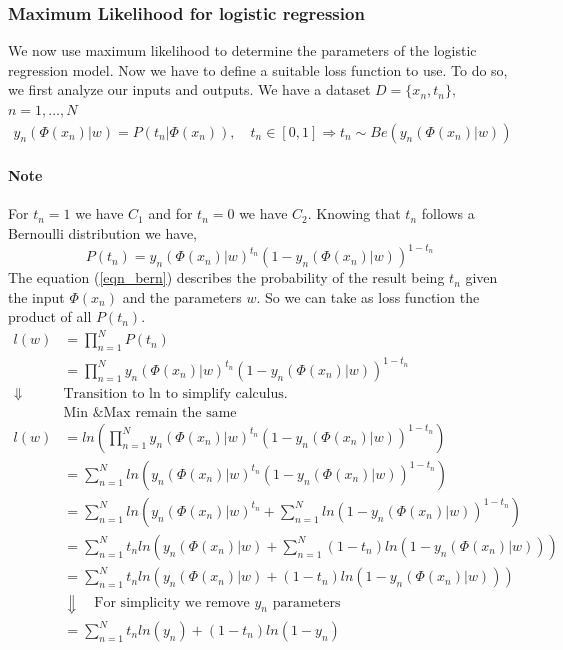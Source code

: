 \documentclass[main.tex]{subfiles}
\begin{document}
\subsubsection{Maximum Likelihood for logistic regression}
We now use maximum likelihood to determine the parameters of the logistic regression model. Now we have to define a suitable loss function to use. To do so, we first analyze our inputs and outputs. We have a dataset $D = \{x_n, t_n\},$ $n=1,\dots,N$
\begin{align*}
    y_n(\Phi(x_n)|w) = P(t_n|\Phi(x_n)), \quad t_n \in [0,1] \Rightarrow t_n \sim Be(y_n(\Phi(x_n)|w))
\end{align*}
\paragraph{Note} For $t_n = 1$ we have $C_1$ and for $t_n = 0$ we have $C_2$.
\newline \newline
Knowing that $t_n$ follows a Bernoulli distribution we have,
\begin{equation}
    P(t_n) = y_n(\Phi(x_n)|w)^{t_n} (1 - y_n(\Phi(x_n)|w))^{1- t_n} \label{eqn_bern}
\end{equation}
The equation (\ref{eqn_bern}) describes the probability of the result being $t_n$ given the input $\Phi(x_n)$ and the parameters $w$. So we can take as loss function the product of all $P(t_n)$.
\begin{align*}
    l(w) &= \prod_{n=1}^N P(t_n) \\
    &= \prod_{n=1}^N y_n(\Phi(x_n)|w)^{t_n} (1 - y_n(\Phi(x_n)|w))^{1- t_n} \\
    \Downarrow \quad & \text{Transition to ln to simplify calculus.} \\
    & \text{Min \& Max remain the same}\\
    l(w) &= ln(\prod_{n=1}^N y_n(\Phi(x_n)|w)^{t_n} (1 - y_n(\Phi(x_n)|w))^{1- t_n}) \\
    &= \sum_{n=1}^N ln(y_n(\Phi(x_n)|w)^{t_n} (1 - y_n(\Phi(x_n)|w))^{1- t_n}) \\
    &= \sum_{n=1}^N ln(y_n(\Phi(x_n)|w)^{t_n} + \sum_{n=1}^N ln(1 - y_n (\Phi(x_n)|w))^{1- t_n}) \\
    &= \sum_{n=1}^N t_n ln(y_n(\Phi(x_n)|w) + \sum_{n=1}^N (1 - t_n)ln(1 - y_n (\Phi(x_n)|w))) \\
    &= \sum_{n=1}^N t_n ln(y_n(\Phi(x_n)|w) + (1 - t_n)ln(1 - y_n (\Phi(x_n)|w))) \\
    &\Downarrow \quad \text{For simplicity we remove }y_n\text{ parameters} \\
    &= \sum_{n=1}^N t_n ln(y_n) + (1 - t_n)ln(1 - y_n)
\end{align*}
\end{document}
